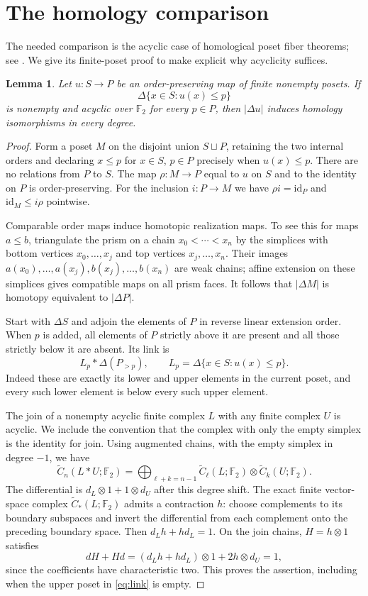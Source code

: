 \documentclass[11pt,a4paper]{article}
\newtheorem{lemma}[theorem]{Lemma}
\newcommand{\F}{\mathbb F_2}
\begin{document}
\section{The homology comparison}

The needed comparison is the acyclic case of homological poset fiber
theorems; see \cite[author manuscript, Section~4]{BWW}. We give its finite-poset proof to make
explicit why acyclicity suffices.

\begin{lemma}\label{lem:poset}
Let $u:S\to P$ be an order-preserving map of finite nonempty posets. If
\[
 \Delta\{x\in S:u(x)\leq p\}
\]
is nonempty and acyclic over $\F$ for every $p\in P$, then $|\Delta u|$
induces homology isomorphisms in every degree.
\end{lemma}

\begin{proof}
Form a poset $M$ on the disjoint union $S\sqcup P$, retaining the two
internal orders and declaring $x\leq p$ for $x\in S$, $p\in P$ precisely
when $u(x)\leq p$. There are no relations from $P$ to $S$. The map
$\rho:M\to P$ equal to $u$ on $S$ and to the identity on $P$ is
order-preserving. For the inclusion $i:P\to M$ we have $\rho i=\mathrm{id}_P$
and $\mathrm{id}_M\leq i\rho$ pointwise.

Comparable order maps induce homotopic realization maps. To see this for
maps $a\leq b$, triangulate the prism on a chain $x_0<\cdots<x_n$ by the
simplices with bottom vertices $x_0,\ldots,x_j$ and top vertices
$x_j,\ldots,x_n$. Their images
$a(x_0),\ldots,a(x_j),b(x_j),\ldots,b(x_n)$ are weak chains; affine extension
on these simplices gives compatible maps on all prism faces. It follows
that $|\Delta M|$ is homotopy equivalent to $|\Delta P|$.

Start with $\Delta S$ and adjoin the elements of $P$ in reverse linear
extension order. When $p$ is added, all elements of $P$ strictly above it
are present and all those strictly below it are absent. Its link is
\begin{equation}\label{eq:link}
 L_p*\Delta(P_{>p}),\qquad
 L_p=\Delta\{x\in S:u(x)\leq p\}.
\end{equation}
Indeed these are exactly its lower and upper elements in the current poset,
and every such lower element is below every such upper element.

The join of a nonempty acyclic finite complex $L$ with any finite complex
$U$ is acyclic. We include the convention that the complex with only the
empty simplex is the identity for join. Using augmented chains, with the
empty simplex in degree $-1$, we have
\[
 \widetilde C_n(L*U;\F)
 =\bigoplus_{\ell+k=n-1}\widetilde C_\ell(L;\F)\otimes
                  \widetilde C_k(U;\F).
\]
The differential is $d_L\otimes1+1\otimes d_U$ after this degree shift.
The exact finite vector-space complex $\widetilde C_*(L;\F)$ admits a
contraction $h$: choose complements to its boundary subspaces and invert
the differential from each complement onto the preceding boundary space.
Then $d_Lh+hd_L=1$. On the join chains, $H=h\otimes1$ satisfies
\[
 dH+Hd=(d_Lh+hd_L)\otimes1+2h\otimes d_U=1,
\]
since the coefficients have characteristic two. This proves the assertion,
including when the upper poset in \eqref{eq:link} is empty.


\end{proof}
\end{document}
